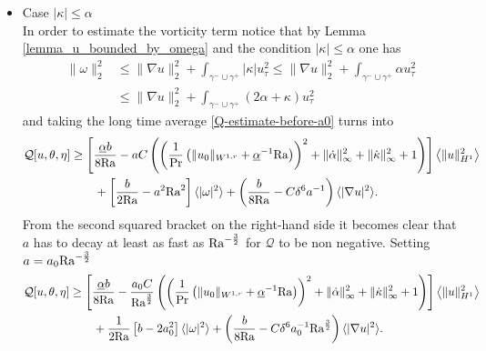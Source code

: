 \documentclass{article}
\theoremstyle{definition}
\theoremstyle{definition}
\newcommand{\Pra}{\rm{Pr}}
\newcommand{\Ra}{{\rm{Ra}}}
\begin{document}
\begin{itemize}
    \item Case $|\kappa|\leq \alpha$
    \vspace{10pt}\\
        In order to estimate the vorticity term notice that by Lemma \ref{lemma_u_bounded_by_omega} and the condition $|\kappa|\leq \alpha$ one has
        \begin{align*}
            \|\omega\|_2^2 &\leq \|\nabla u\|_2^2 + \int_{\gamma^-\cup\gamma^+} |\kappa| u_\tau^2 \leq \|\nabla u\|_2^2 + \int_{\gamma^-\cup\gamma^+} \alpha u_\tau^2 
            \\
            &\leq \|\nabla u\|_2^2 + \int_{\gamma^-\cup\gamma^+} (2\alpha+\kappa) u_\tau^2
        \end{align*}
        and taking the long time average \eqref{Q-estimate-before-a0} turns into
        \begin{align*}
            \mathcal{Q}[u,\theta,\eta] &\geq \left[\frac{\underline{\alpha} b}{8\Ra} - a C\left(\left(\frac{1}{\Pra}\left(\|u_0\|_{W^{1,r}} +\underline{\alpha}^{-1}\Ra\right)\right)^2+\|\dot\alpha\|_\infty^2+\|\dot\kappa\|_\infty^2+1\right) \right]\left\langle\|u\|_{H^1}^2\right\rangle
            \\
            &\qquad + \left[\frac{b}{2\Ra}- a^2\Ra^2\right]  \langle |\omega|^2\rangle + \left(\frac{b}{8\Ra}-C\delta^6 a^{-1}\right) \langle |\nabla u|^2\rangle.
        \end{align*}
        From the second squared bracket on the right-hand side it becomes clear that $a$ has to decay at least as fast as $\Ra^{-\frac{3}{2}}$ for $\mathcal{Q}$ to be non negative. Setting $a=a_0 \Ra^{-\frac{3}{2}}$
        \begin{align*}
            \mathcal{Q}[u,\theta,\eta] &\geq \left[\frac{\underline{\alpha} b}{8\Ra} - \frac{a_0 C}{\Ra^{\frac{3}{2}}} \left(\left(\frac{1}{\Pra}\left(\|u_0\|_{W^{1,r}} +\underline{\alpha}^{-1}\Ra\right)\right)^2+\|\dot\alpha\|_\infty^2+\|\dot\kappa\|_\infty^2+1\right) \right]\left\langle\|u\|_{H^1}^2\right\rangle
            \\
            &\qquad + \frac{1}{2\Ra}\left[b- 2a_0^2\right]  \langle |\omega|^2\rangle + \left(\frac{b}{8\Ra}-C\delta^6 a_0^{-1}\Ra^\frac{3}{2}\right) \langle |\nabla u|^2\rangle.

\end{align*}
\end{itemize}
\end{document}
